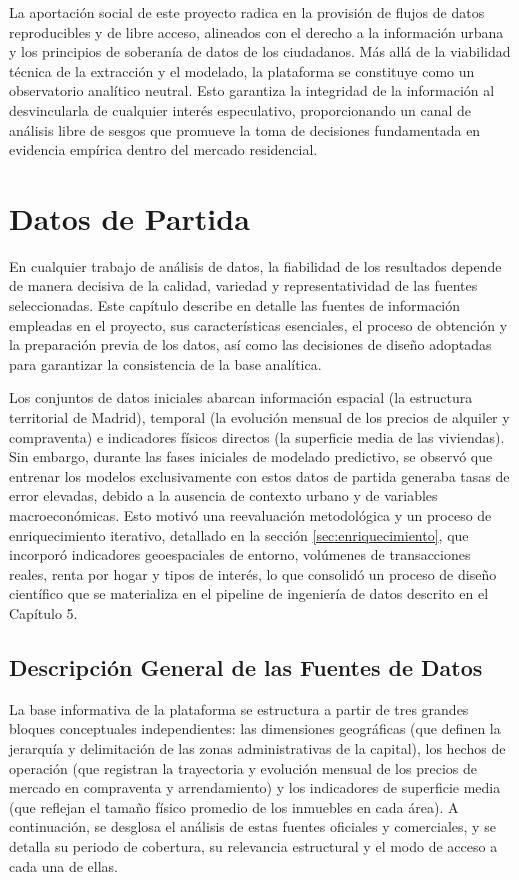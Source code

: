 \documentclass[a4paper,11pt,openany]{book}
\begin{document}
La aportación social de este proyecto radica en la provisión de flujos de datos reproducibles y de libre acceso, alineados con el derecho a la información urbana y los principios de soberanía de datos de los ciudadanos. Más allá de la viabilidad técnica de la extracción y el modelado, la plataforma se constituye como un observatorio analítico neutral. Esto garantiza la integridad de la información al desvincularla de cualquier interés especulativo, proporcionando un canal de análisis libre de sesgos que promueve la toma de decisiones fundamentada en evidencia empírica dentro del mercado residencial.

\chapter{Datos de Partida}
\label{chap:datos}
En cualquier trabajo de análisis de datos, la fiabilidad de los resultados depende de manera decisiva de la calidad, variedad y representatividad de las fuentes seleccionadas. Este capítulo describe en detalle las fuentes de información empleadas en el proyecto, sus características esenciales, el proceso de obtención y la preparación previa de los datos, así como las decisiones de diseño adoptadas para garantizar la consistencia de la base analítica.

Los conjuntos de datos iniciales abarcan información espacial (la estructura territorial de Madrid), temporal (la evolución mensual de los precios de alquiler y compraventa) e indicadores físicos directos (la superficie media de las viviendas). Sin embargo, durante las fases iniciales de modelado predictivo, se observó que entrenar los modelos exclusivamente con estos datos de partida generaba tasas de error elevadas, debido a la ausencia de contexto urbano y de variables macroeconómicas. Esto motivó una reevaluación metodológica y un proceso de enriquecimiento iterativo, detallado en la sección \ref{sec:enriquecimiento}, que incorporó indicadores geoespaciales de entorno, volúmenes de transacciones reales, renta por hogar y tipos de interés, lo que consolidó un proceso de diseño científico que se materializa en el pipeline de ingeniería de datos descrito en el Capítulo 5.

\section{Descripción General de las Fuentes de Datos}
La base informativa de la plataforma se estructura a partir de tres grandes bloques conceptuales independientes: las dimensiones geográficas (que definen la jerarquía y delimitación de las zonas administrativas de la capital), los hechos de operación (que registran la trayectoria y evolución mensual de los precios de mercado en compraventa y arrendamiento) y los indicadores de superficie media (que reflejan el tamaño físico promedio de los inmuebles en cada área). A continuación, se desglosa el análisis de estas fuentes oficiales y comerciales, y se detalla su periodo de cobertura, su relevancia estructural y el modo de acceso a cada una de ellas.
\end{document}
